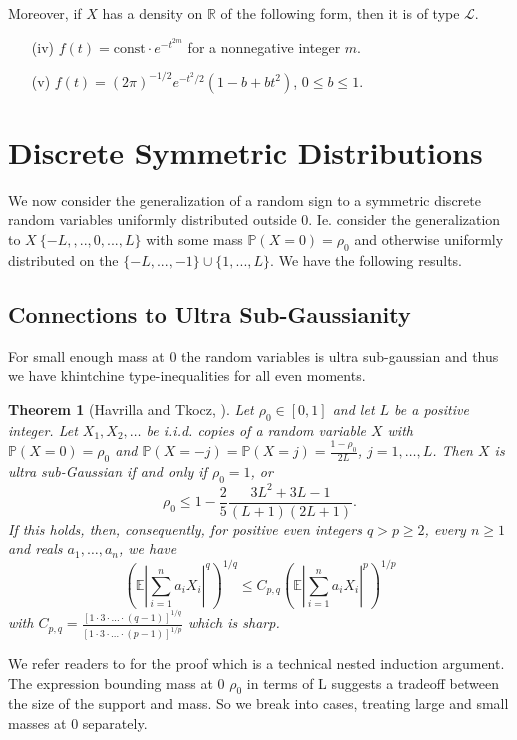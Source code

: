 \documentclass[10pt]{article}
\newcommand{\Pp}{\mathbb{P}}
\newcommand{\E}{\mathbb{E}}
\newcommand{\1}{\textbf{1}}
\newcommand{\R}{\mathbb{R}}
\newcommand{\p}[1]{\mathbb{P}\left( #1 \right)}
\newtheorem{theorem}{Theorem}[subsection]
\theoremstyle{remark}
\theoremstyle{definition}
\begin{document}
\begin{enumerate}[(a)]
Moreover, if $X$ has a density on $\R$ of the following form, then it is of type $\mathcal{L}$.

\begin{enumerate}
\item[(iv)] $f(t) = \text{const}\cdot e^{-t^{2m}}$ for a nonnegative integer $m$.  

\item[(v)] $f(t) = (2\pi)^{-1/2}e^{-t^2/2}(1-b+ bt^2)$, $0 \leq b \leq 1$.
\end{enumerate}


\end{enumerate}

\newpage

\section{Discrete Symmetric Distributions}

We now consider the generalization of a random sign to a symmetric discrete random variables uniformly distributed outside 0. Ie. consider the generalization to $X ~ \{-L,,..,0,...,L\}$ with some mass $\Pp(X = 0) = \rho_0$ and otherwise uniformly distributed on the $\{-L,...,-1\} \cup \{1,...,L\}$. We have the following results.

\subsection{Connections to Ultra Sub-Gaussianity}

For small enough mass at 0 the random variables is ultra sub-gaussian and thus we have khintchine type-inequalities for all even moments.

\begin{theorem}[Havrilla and Tkocz, \cite{HT}]\label{thm:USG}
Let $\rho_0 \in [0,1]$ and let $L$ be a positive integer. Let $X_1, X_2,\dots$ be i.i.d. copies of a random variable $X$ with $\p{X=0} = \rho_0$ and $\p{X = -j} = \p{X = j} = \frac{1-\rho_0}{2L}$, $j = 1,\dots,L$. Then $X$ is ultra sub-Gaussian if and only if $\rho_0 = 1$, or
\begin{equation}\label{eq:USG-rho}
\rho_0 \leq 1 - \frac{2}{5}\frac{3L^2+3L-1}{(L+1)(2L+1)}.
\end{equation}
If this holds, then, consequently, for positive even integers $q > p \geq 2$, every $n \geq 1$ and reals $a_1,\dots,a_n$, we have
\begin{equation}\label{eq:Khin-even}
\left(\E\left|\sum_{i=1}^n a_iX_i\right|^q\right)^{1/q} \leq C_{p,q}\left(\E\left|\sum_{i=1}^n a_iX_i\right|^p\right)^{1/p}
\end{equation}
with $C_{p,q} = \frac{[1\cdot 3\cdot\ldots \cdot (q-1)]^{1/q}}{[1\cdot 3\cdot\ldots \cdot (p-1)]^{1/p}}$ which is sharp.
\end{theorem} We refer readers to \cite{HT} for the proof which is a technical nested induction argument. The expression bounding mass at 0 $\rho_0$ in terms of L suggests a tradeoff between the size of the support and mass. So we break into cases, treating large and small masses at 0 separately. 
\end{document}
